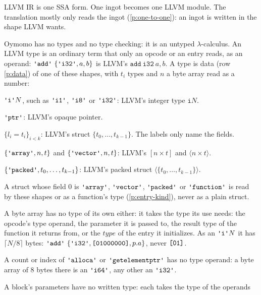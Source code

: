 \documentclass[11pt,letterpaper]{article}
\newcommand{\kw}[1]{\mathtt{#1}}
\newcommand{\str}[1]{\text{\ttfamily\textquotesingle #1\textquotesingle}}  %
\newcommand{\hex}[1]{\text{\ttfamily [#1]}}  %
\newcounter{pt}
\newcommand{\pref}[1]{\ref{#1}}  %
\begin{document}
\begin{points}
\item\label{p:llvm-module} LLVM IR is one SSA form. One ingot becomes one LLVM module. The translation mostly only reads the ingot (\pref{p:one-to-one}):
  an ingot is written in the shape LLVM wants.
\item\label{p:types}
  Oymomo has no types and no type checking: it is an untyped $\lambda$-calculus. An LLVM type is an
  ordinary term that only an opcode or an entry reads, as an operand: $\str{add}\ \{\str{i32}, a, b\}$ is LLVM's
  $\kw{add\ i32}\ a, b$.
  A type is data (row \pref{p:data}) of one of these shapes, with $t_i$ types and $n$ a byte array read as a number:
  \begin{subpoints}
  \item $\str{i}N$, such as $\str{i1}$, $\str{i8}$ or $\str{i32}$: LLVM's integer type $\kw{i}N$.
  \item $\str{ptr}$: LLVM's opaque pointer.
  \item $\{l_i = t_i\}_{i<k}$: LLVM's struct $\{t_0, \dots, t_{k-1}\}$. The labels only name the fields.
  \item $\{\str{array}, n, t\}$ and $\{\str{vector}, n, t\}$: LLVM's $[n \times t]$ and $\langle n \times t\rangle$.
  \item $\{\str{packed}, t_0, \dots, t_{k-1}\}$: LLVM's packed struct $\langle\{t_0, \dots, t_{k-1}\}\rangle$.
  \item A struct whose field $0$ is $\str{array}$, $\str{vector}$, $\str{packed}$ or $\str{function}$ is read by these
    shapes or as a function's type (\pref{p:entry-kind}), never as a plain struct.
  \end{subpoints}
\item\label{p:bytes-type} A byte array has no type of its own either: it takes the type its use needs: the
  opcode's type operand, the parameter it is passed to, the result type of the function it returns from, or
  the $\mathit{type}$ of the entry it initializes. As an $\str{i}N$ it has $\lceil N/8 \rceil$ bytes:
  $\str{add}\ \{\str{i32}, \hex{01000000}, p.a\}$, never $\hex{01}$.
  \begin{subpoints}
  \item A count or index of $\str{alloca}$ or $\str{getelementptr}$ has no type operand: a byte array of $8$ bytes there is an
    $\str{i64}$, any other an $\str{i32}$.
  \end{subpoints}
\item\label{p:infer} A block's parameters have no written type: each takes the type of the operands

\end{points}
\end{document}
